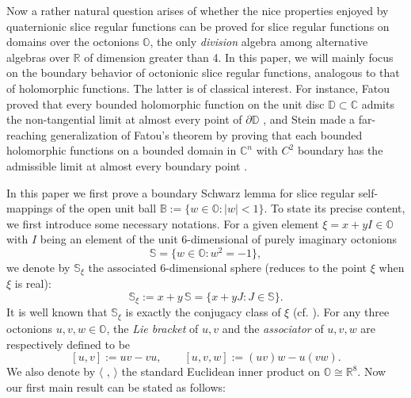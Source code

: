 \documentclass{amsart}
\theoremstyle{definition}
\theoremstyle{remark}
\numberwithin{equation}{section}
\begin{document}
Now a rather natural question arises of whether the nice properties enjoyed by quaternionic slice regular functions can be proved for  slice regular functions on domains over the octonions $\mathbb O$,  the only   \textit{division} algebra among alternative algebras over $\mathbb R$ of dimension greater than 4. In this paper, we will mainly focus on the boundary behavior of octonionic slice regular functions, analogous to that of holomorphic functions. The latter  is of classical interest. For instance, Fatou proved that every bounded holomorphic function  on the unit disc $\mathbb D\subset \mathbb C$ admits the non-tangential limit at almost every point of $\partial\mathbb D$ \cite{Fatou}, and Stein made a far-reaching generalization of Fatou's theorem by proving that each bounded holomorphic functions on a bounded domain in $\mathbb C^n$ with $C^2$ boundary has the admissible limit at almost every boundary point \cite{Stein}.

In this paper we first prove a boundary Schwarz lemma for slice regular self-mappings of the open unit ball $\mathbb B:=\{w\in \mathbb O: |w|<1\}$. To state its precise content, we first introduce some necessary notations. For a given element $\xi=x+y I\in\mathbb O$ with
$I$ being an element of the unit 6-dimensional of purely imaginary octonions
\begin{equation}\label{Pure-sphere}
\mathbb S=\big\{w \in \mathbb O:w^2 =-1\big\},
\end{equation}
we denote by $\mathbb S_{\xi}$ the associated 6-dimensional sphere (reduces to the point $\xi$ when $\xi$ is real):
$$\mathbb S_{\xi}:=x+y\, \mathbb S=\big\{x+y J: J\in\mathbb S\big\}.$$
It is well known  that $\mathbb S_{\xi}$ is exactly the conjugacy class of $\xi$ (cf. \cite[Proposition 2, Corollary 2.1]{Serodio}). For any three octonions $u, v, w\in\mathbb O$, the \textit{Lie bracket} of $u,v $ and the \textit{associator} of  $u, v, w$ are respectively defined to be
$$[u, v]:=uv-vu,\qquad [u, v, w]:=(uv)w-u(vw).$$
We also denote by $\langle$ , $\rangle$ the standard Euclidean inner product on $\mathbb O\cong\mathbb R^8$. Now our first main result can be stated as follows:
\end{document}
